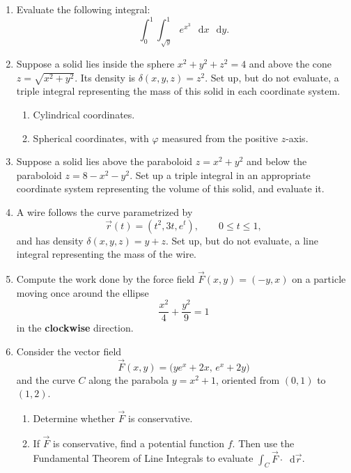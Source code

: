 \documentclass[12pt,letterpaper]{article}
\newcommand{\dd}{\mathop{}\!\mathrm{d}}
\begin{document}
\begin{enumerate}[label=\arabic*.,leftmargin=2em,labelsep=0.6em,
                  itemsep=1.2em,parsep=0pt,topsep=0pt]

\item Evaluate the following integral:
\[
  \int_0^1\int_{\sqrt{y}}^1 e^{x^3}\,\dd x\,\dd y.
\]

\item Suppose a solid lies inside the sphere $x^2+y^2+z^2=4$ and above the
cone $z=\sqrt{x^2+y^2}$. Its density is
$\delta(x,y,z)=z^2$. Set up, but do not evaluate, a triple integral
representing the mass of this solid in each coordinate system.

\begin{enumerate}[label=(\alph*),leftmargin=1.8em,topsep=0.4em,itemsep=0.2em]
  \item Cylindrical coordinates.
  \item Spherical coordinates, with $\varphi$ measured from the positive
        $z$-axis.
\end{enumerate}

\item Suppose a solid lies above the paraboloid $z=x^2+y^2$ and below the
paraboloid $z=8-x^2-y^2$. Set up a triple integral in an appropriate
coordinate system representing the volume of this solid, and evaluate it.

\item A wire follows the curve parametrized by
\[
  \vec r(t)=(t^2,3t,e^t),\qquad 0\leq t\leq1,
\]
and has density $\delta(x,y,z)=y+z$. Set up, but do not evaluate,
a line integral representing the mass of the wire.

\item Compute the work done by the force field $\vec F(x,y)=(-y,x)$ on a
particle moving once around the ellipse
\[
  \frac{x^2}{4}+\frac{y^2}{9}=1
\]
in the \textbf{clockwise} direction.

\item Consider the vector field
\[
  \vec F(x,y)=\bigl(ye^x+2x,\,e^x+2y\bigr)
\]
and the curve $C$ along the parabola $y=x^2+1$, oriented from $(0,1)$
to $(1,2)$.

\begin{enumerate}[label=(\alph*),leftmargin=1.8em,topsep=0.4em,itemsep=0.2em]
  \item Determine whether $\vec F$ is conservative.
  \item If $\vec F$ is conservative, find a potential
        function $f$. Then use the Fundamental Theorem of Line Integrals
        to evaluate $\displaystyle\int_C\vec F\cdot\dd\vec r$.
\end{enumerate}

\end{enumerate}
\end{document}
